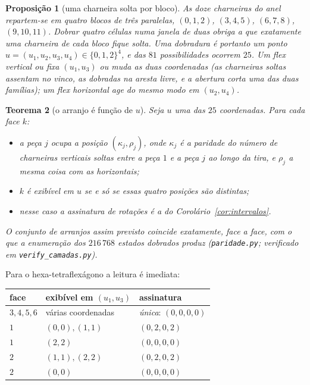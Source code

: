\documentclass[11pt,a4paper]{article}
\theoremstyle{plain}
\newtheorem{teorema}{Teorema}[section]
\newtheorem{proposicao}[teorema]{Proposição}
\theoremstyle{definition}
\theoremstyle{remark}
\begin{document}
\begin{proposicao}[uma charneira solta por bloco]\label{prop:solta}
As doze charneiras do anel repartem-se em quatro blocos de três paralelas,
$(0,1,2)$, $(3,4,5)$, $(6,7,8)$, $(9,10,11)$. Dobrar quatro células numa janela
de duas obriga a que \emph{exatamente uma} charneira de cada bloco fique
solta. Uma dobradura é portanto um ponto
$u=(u_1,u_2,u_3,u_4)\in\{0,1,2\}^4$, e das $81$ possibilidades ocorrem $25$.
Um flex vertical ou fixa $(u_1,u_3)$ ou muda \emph{as duas} coordenadas (as
charneiras soltas assentam no vinco, as dobradas na aresta livre, e a abertura
corta uma das duas famílias); um flex horizontal age do mesmo modo em
$(u_2,u_4)$.
\end{proposicao}

\begin{teorema}[o arranjo é função de $u$]\label{thm:combinatoria}
Seja $u$ uma das $25$ coordenadas. Para cada face $k$:
\begin{itemize}\itemsep2pt
\item a peça $j$ ocupa a posição $(\kappa_j,\rho_j)$, onde $\kappa_j$ é a
      paridade do número de charneiras verticais \emph{soltas} entre a peça $1$
      e a peça $j$ ao longo da tira, e $\rho_j$ a mesma coisa com as
      horizontais;
\item $k$ é exibível em $u$ se e só se essas quatro posições são distintas;
\item nesse caso a assinatura de rotações é a do
      Corolário~\ref{cor:intervalos}.
\end{itemize}
O conjunto de arranjos assim previsto coincide \emph{exatamente}, face a face,
com o que a enumeração dos $216\,768$ estados dobrados produz
(\texttt{paridade.py}; verificado em \texttt{verify\_camadas.py}).
\end{teorema}

Para o hexa-tetraflexágono a leitura é imediata:

\begin{center}
\renewcommand{\arraystretch}{1.2}
\begin{tabular}{lll}
\toprule
face & exibível em $(u_1,u_3)$ & assinatura\\
\midrule
$3,4,5,6$ & várias coordenadas & \emph{única}: $(0,0,0,0)$\\
$1$ & $(0,0),(1,1)$ & $(0,2,0,2)$\\
$1$ & $(2,2)$ & $(0,0,0,0)$\\
$2$ & $(1,1),(2,2)$ & $(0,2,0,2)$\\
$2$ & $(0,0)$ & $(0,0,0,0)$\\
\bottomrule
\end{tabular}
\end{center}
\end{document}
